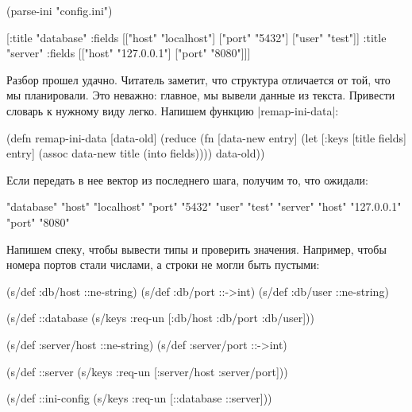 \begin{english}
  \begin{clojure}
(parse-ini "config.ini")

[{:title "database"
  :fields [["host" "localhost"]
           ["port" "5432"]
           ["user" "test"]]}
 {:title "server"
  :fields [["host" "127.0.0.1"]
           ["port" "8080"]]}]
  \end{clojure}
\end{english}

Разбор прошел удачно. Читатель заметит, что структура отличается от той, что мы
планировали. Это неважно: главное, мы вывели данные из текста. Привести словарь
к нужному виду легко. Напишем функцию \spverb|remap-ini-data|:

\begin{english}
  \begin{clojure}
(defn remap-ini-data [data-old]
  (reduce
   (fn [data-new entry]
     (let [{:keys [title fields]} entry]
       (assoc data-new title (into {} fields))))
   {}
   data-old))
  \end{clojure}
\end{english}

\noindent
Если передать в нее вектор из последнего шага, получим то, что ожидали:

\begin{english}
  \begin{clojure}
{"database" {"host" "localhost" "port" "5432" "user" "test"}
 "server" {"host" "127.0.0.1" "port" "8080"}}
  \end{clojure}
\end{english}

Напишем спеку, чтобы вывести типы и проверить значения. Например, чтобы номера
портов стали числами, а строки не могли быть пустыми:

\begin{english}
  \begin{clojure}
(s/def :db/host ::ne-string)
(s/def :db/port ::->int)
(s/def :db/user ::ne-string)

(s/def ::database
  (s/keys :req-un [:db/host :db/port :db/user]))

(s/def :server/host ::ne-string)
(s/def :server/port ::->int)

(s/def ::server
  (s/keys :req-un [:server/host :server/port]))

(s/def ::ini-config
  (s/keys :req-un [::database ::server]))
  \end{clojure}
\end{english}


